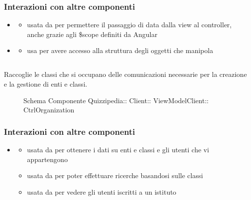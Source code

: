\subsubsection{Interazioni con altre componenti}
\begin{itemize}
\item {}
\begin{itemize}
\item usata da  per permettere il passaggio di data dalla view al controller, anche grazie agli \$scope definiti da Angular
\end{itemize}
\item {}
\begin{itemize}
\item usa  per avere accesso alla struttura degli oggetti che manipola
\end{itemize}
\end{itemize}
\subsection{}
Raccoglie le classi che si occupano delle comunicazioni necessarie per la creazione e la gestione di enti e classi.
\begin{figure}[H]
\centering
\noindent{}
\caption[Schema Componente CtrlOrganization]{Schema Componente Quizzipedia:: Client:: ViewModelClient:: CtrlOrganization}
\end{figure}
\subsubsection{Interazioni con altre componenti}
\begin{itemize}
\item {}
\begin{itemize}
\item usata da  per ottenere i dati su enti e classi e gli utenti che vi appartengono
\item usata da  per poter effettuare ricerche basandosi sulle classi
\item usata da  per vedere gli utenti iscritti a un istituto
\end{itemize}
\end{itemize}
